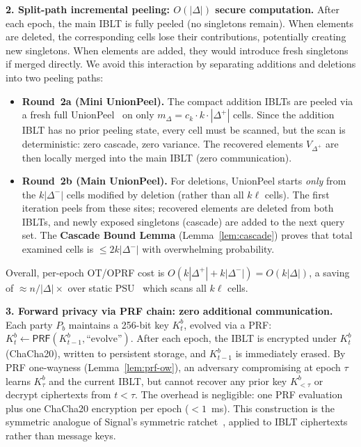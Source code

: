 \documentclass[letterpaper,twocolumn,10pt]{article}
\theoremstyle{definition}
\newcommand{\PRF}{\mathsf{PRF}}\newcommand{\ChaCha}{\mathsf{ChaCha20}}
\begin{document}
\smallskip\noindent\textbf{2. Split-path incremental peeling: $O(|\Delta|)$ secure computation.}
After each epoch, the main IBLT is fully peeled (no singletons remain). When
elements are deleted, the corresponding cells lose their contributions,
potentially creating new singletons. When elements are added, they would
introduce fresh singletons if merged directly. We avoid this interaction by
separating additions and deletions into two peeling paths:

\begin{itemize}
\item \textbf{Round~2a (Mini UnionPeel).} The compact addition IBLTs are
peeled via a fresh full UnionPeel~\cite{PT26} on only $m_{\Delta} =
c_k \cdot k \cdot |\Delta^+|$ cells. Since the addition IBLT has no prior
peeling state, every cell must be scanned, but the scan is deterministic:
zero cascade, zero variance. The recovered elements $V_{\Delta^+}$ are then
locally merged into the main IBLT (zero communication).

\item \textbf{Round~2b (Main UnionPeel).} For deletions, UnionPeel starts
\emph{only} from the $k|\Delta^-|$ cells modified by deletion (rather than
all $k\ell$ cells). The first iteration peels from these sites; recovered
elements are deleted from both IBLTs, and newly exposed singletons
(cascade) are added to the next query set. The \textbf{Cascade Bound Lemma}
(Lemma~\ref{lem:cascade}) proves that total examined cells is $\leq
2k|\Delta^-|$ with overwhelming probability.
\end{itemize}

Overall, per-epoch OT/OPRF cost is $O(k|\Delta^+| + k|\Delta^-|) =
O(k|\Delta|)$, a saving of $\approx n/|\Delta| \times$ over static
PSU~\cite{PT26} which scans all $k\ell$ cells.

\smallskip\noindent\textbf{3. Forward privacy via PRF chain: zero additional communication.}
Each party $P_b$ maintains a 256-bit key $K^b_t$, evolved via a PRF:
$K^b_t \leftarrow \PRF(K^b_{t-1}, \text{``evolve''})$. After each epoch, the
IBLT is encrypted under $K^b_t$ (ChaCha20), written to persistent storage, and
$K^b_{t-1}$ is immediately erased. By PRF one-wayness
(Lemma~\ref{lem:prf-ow}), an adversary compromising at epoch $\tau$ learns
$K^b_\tau$ and the current IBLT, but cannot recover any prior key
$K^b_{<\tau}$ or decrypt ciphertexts from $t < \tau$. The overhead is
negligible: one PRF evaluation plus one ChaCha20 encryption per epoch
($<1$~ms). This construction is the symmetric analogue of Signal's symmetric
ratchet~\cite{Signal}, applied to IBLT ciphertexts rather than message keys.
\end{document}
